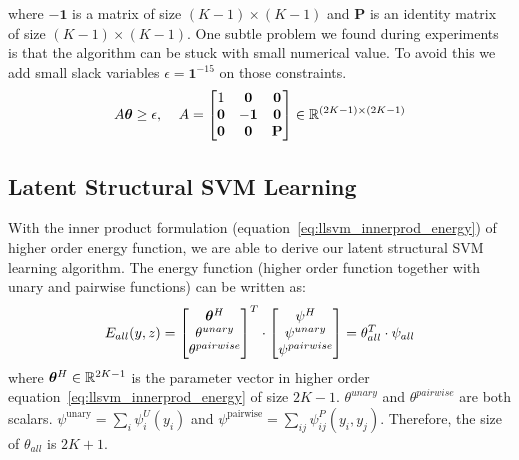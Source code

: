 \noindent where $-\mathbf{1}$ is a matrix of size $(K-1)\times(K-1)$ and
$\mathbf{P}$ is an identity matrix of size $(K-1)\times(K-1)$.
One subtle problem we found during experiments is that the
algorithm can be stuck with small numerical value. To avoid this
we add small slack variables $\epsilon=\mathbf{1}^{-15}$ on 
those constraints.
\begin{align}
  \label{eq:concave_constraint}
  A{\bm{\theta}}\geq\epsilon \text{,\;~~~} A=
                  \begin{bmatrix}
                    1 & \mathbf{0} & \mathbf{0}\\
                    \mathbf{0} & -\mathbf{1} & \mathbf{0}\\
                    \mathbf{0} & \mathbf{0} & \mathbf{P}
                  \end{bmatrix}\in \mathbb{R}^{(2K-1)\times(2K-1)}
\end{align}

\subsection{Latent Structural SVM Learning}
\label{sec:mrflssvm_learning_algo}

With the inner product formulation
(equation~\eqref{eq:llsvm_innerprod_energy}) of higher order
energy function, we are able to derive our latent
structural SVM learning algorithm. The energy function (higher
order function together with unary and pairwise functions) can be
written as:
\begin{equation}
  E_{all}(y,z) = \begin{bmatrix}
    {\bm{\theta}}^H\\
    \theta^{unary}\\
    \theta^{pairwise}
  \end{bmatrix}^T 
  \cdot \begin{bmatrix}
    \psi^H\\
    \psi^{unary}\\
    \psi^{pairwise}
  \end{bmatrix}=\theta_{all}^T\cdot\psi_{all}
\end{equation}
where ${\bm{\theta}}^H\in {\mathbb{R}}^{2K-1}$ is the parameter vector in higher
order equation~\eqref{eq:llsvm_innerprod_energy} of size $2K-1$.
$\theta^{unary}$ and $\theta^{pairwise}$ are both scalars.
$\psi^\textrm{unary} = \sum_i \psi^U_i\!(y_i)$ and
$\psi^\textrm{pairwise} = \sum_{ij} \psi^P_{ij}(y_i, y_j)$.
Therefore, the size of $\theta_{all}$ is $2K+1$.

